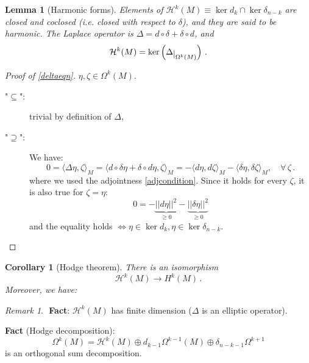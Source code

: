 \documentclass[a4paper,11pt,titlepage, article, oneside]{memoir}
\numberwithin{equation}{section}
\newtheorem{corollary}[theorem]{Corollary}
\newtheorem{lemma}[theorem]{Lemma}
\theoremstyle{definition}
\theoremstyle{remark}
\newtheorem{remark}[theorem]{Remark}
\newcommand{\restrict}[2]{{#1}\raisebox{-.5ex}{$|$}_{#2}}
\begin{document}
\begin{lemma}[Harmonic forms]
Elements of $\mathcal{H}^k(M) \equiv \ker d_k \cap \ker \delta_{n-k}$ are closed and coclosed (i.e. closed with respect to $\delta$), and they are said to be harmonic. The Laplace operator is $\Delta = d \circ \delta + \delta \circ d$, and
\begin{equation} \label{deltaeqn}
\mathcal{H}^k(M) = \ker \left ( \restrict{\Delta}{\Omega^k(M)} \right ) \, .
\end{equation}
\end{lemma}
\begin{proof}[Proof of \ref{deltaeqn}]
$\eta, \zeta \in \Omega^k(M)$.
\begin{description}
\item["$\subseteq$":] trivial by definition of $\Delta$,
\item["$\supseteq$":]  We have:
$$0 = \langle \Delta \eta, \zeta \rangle_M = \langle d \circ \delta \eta + \delta \circ d \eta, \zeta \rangle_M =- \langle d \eta, d \zeta \rangle_M - \langle \delta \eta, \delta \zeta \rangle_M, \quad \forall\, \zeta \, .$$
where we used the adjointness \eqref{adjcondition}. Since it holds for every $\zeta$, it is also true for $\zeta = \eta$:
$$0 = - \underbrace{|| d \eta ||^2}_{\ge 0} - \underbrace{||\delta \eta||^2}_{\ge 0}$$
and the equality holds $\Leftrightarrow \eta \in \ker d_k, \eta \in \ker \delta_{n-k}$.\qedhere
\end{description}
\end{proof}

\begin{corollary}[Hodge theorem] There is an isomorphism
\begin{equation}
\mathcal{H}^k(M) \rightarrow H^k(M) \, .
\end{equation}
Moreover, we have:
\begin{center}
\end{center}
\end{corollary}

\begin{remarkbox}\begin{remark}
$ $\newline
\textbf{Fact}: $\mathcal{H}^k(M)$ has finite dimension ($\Delta$ is an elliptic operator).

\textbf{Fact} (Hodge decomposition):
$$\Omega^k(M) = \mathcal{H}^k(M) \oplus d_{k-1} \Omega^{k-1}(M) \oplus \delta_{n-k-1} \Omega^{k+1}$$
is an orthogonal sum decomposition.
\end{remark} \end{remarkbox}
\end{document}

